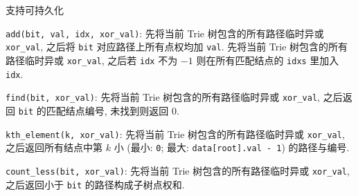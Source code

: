 支持可持久化

\verb|add(bit, val, idx, xor_val)|: 先将当前 Trie 树包含的所有路径临时异或 \verb|xor_val|, 之后将 \verb|bit| 对应路径上所有点权均加 \verb|val|. 先将当前 Trie 树包含的所有路径临时异或 \verb|xor_val|, 之后若 \verb|idx| 不为 \(-1\) 则在所有匹配结点的 \verb|idxs| 里加入 \verb|idx|.

\verb|find(bit, xor_val)|: 先将当前 Trie 树包含的所有路径临时异或 \verb|xor_val|, 之后返回 \verb|bit| 的匹配结点编号, 未找到则返回 \(0\).

\verb|kth_element(k, xor_val)|: 先将当前 Trie 树包含的所有路径临时异或 \verb|xor_val|, 之后返回所有结点中第 \(k\) 小 (最小: \verb|0|; 最大: \verb|data[root].val - 1|) 的路径与编号.

\verb|count_less(bit, xor_val)|: 先将当前 Trie 树包含的所有路径临时异或 \verb|xor_val|, 之后返回小于 \verb|bit| 的路径构成子树点权和.
